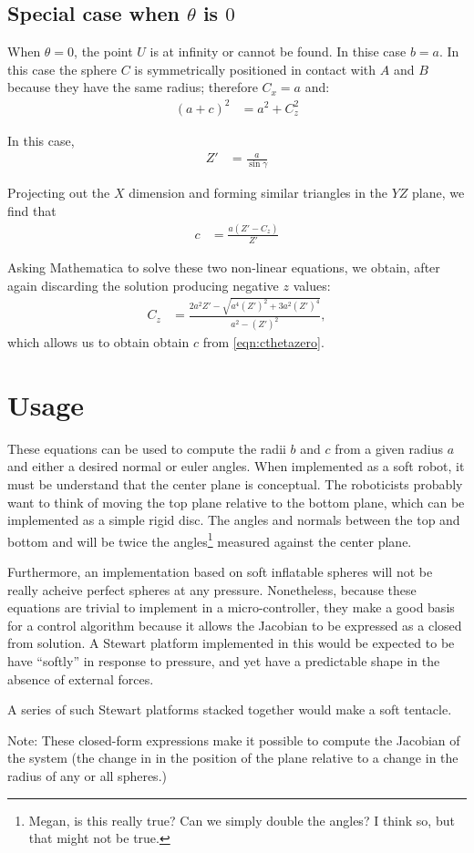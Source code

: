 \documentclass{article}
\begin{document}
\subsection{Special case when $\theta$ is $0$ }

When $\theta = 0$, the point $U$ is at infinity or
cannot be found. In thise case $b = a$.
In this case the sphere $C$ is symmetrically
positioned in contact with $A$ and $B$ because
they have the same radius; therefore $C_x = a$ and:
\begin{align}
(a + c)^2 &= a^2 + C_z^2
\end{align}

In this case,
\begin{align}
Z' &= \frac{a}{\sin{\gamma}}
\end{align}

Projecting out the $X$ dimension and forming
similar triangles in the $YZ$ plane, we find that
\begin{align}
  c &= \frac{a( Z' -C_z )}{Z'} \label{eqn:cthetazero}
\end{align}

Asking Mathematica to solve these two non-linear equations, we obtain,
after again discarding the solution producing negative $z$ values:
\begin{align}
 C_z &=  \frac{2 a^2 Z' - \sqrt{a^4 (Z')^2 + 3 a^2 (Z')^4}}{a^2 - (Z')^2},
\end{align}
which allows us to obtain obtain $c$ from \ref{eqn:cthetazero}.


\section{Usage}

These equations can be used to compute the radii $b$ and $c$
from a given radius $a$ and either a desired normal or euler
angles. When implemented as a soft robot, it must be understand
that the center plane is conceptual. The roboticists probably
want to think of moving the top plane relative to the bottom plane,
which can be implemented as a simple rigid disc.
The angles and normals between the top and bottom and will be
twice the angles\footnote{Megan, is this really true? Can we simply double the angles? I think so, but that might not be true.} measured against the center plane.

Furthermore, an implementation based on soft inflatable spheres
will not be really acheive perfect spheres at any pressure.
Nonetheless, because these equations are trivial to implement
in a micro-controller, they make a good basis for a control
algorithm because it allows the Jacobian to be expressed as a
closed from solution. A Stewart platform implemented in this would
be expected to be have ``softly'' in response to pressure,
and yet have a predictable shape in the absence of external
forces.

A series of such Stewart platforms stacked together would make
a soft tentacle.

Note: These closed-form expressions make it possible to compute the Jacobian of the system (the change in in the position
of the plane relative to a change in the radius of any or all spheres.)

\printbibliography
\end{document}

